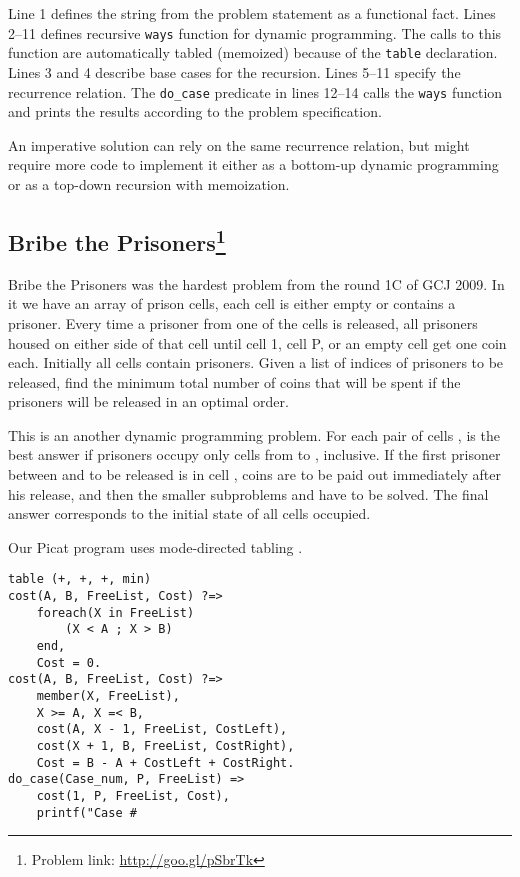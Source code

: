 \documentclass{llncs}
\begin{document}
Line 1 defines the string  from the problem statement as a functional fact.
Lines 2--11 defines recursive \texttt{ways} function for dynamic programming. The calls to this function are automatically tabled (memoized) because of the \texttt{table} declaration.
Lines 3 and 4 describe base cases for the recursion. Lines 5--11 specify the recurrence relation.
The \texttt{do\_case} predicate in lines 12--14 calls the \texttt{ways} function and prints the results according to the problem specification.

An imperative solution can rely on the same recurrence relation, but might require more code to implement it either as a bottom-up dynamic programming or as a top-down recursion with memoization.


\subsection*{Bribe the Prisoners\footnote{Problem link: \url{http://goo.gl/pSbrTk}}}

Bribe the Prisoners was the hardest problem from the round 1C of GCJ 2009.
In it we have an array of  prison cells, each cell is either empty or contains a prisoner. Every time a prisoner from one of the cells is released, all prisoners housed on either side of that cell until cell 1, cell P, or an empty cell get one coin each. Initially all cells contain prisoners.
Given a list of indices of prisoners to be released, find the minimum total number of coins that will be spent if the prisoners will be released in an optimal order.

This is an another dynamic programming problem. For each pair of cells ,  is the best answer if prisoners occupy only cells from  to , inclusive.
If the first prisoner between  and  to be released is in cell ,  coins are to be paid out immediately after his release, and then the smaller subproblems  and  have to be solved. The final answer  corresponds to the initial state of all cells occupied.

Our Picat program uses mode-directed tabling \cite{zhou2010mode}.

\begin{lstlisting}[caption={Picat solution for the ``Bribe the Prisoners'' problem}]
table (+, +, +, min)
cost(A, B, FreeList, Cost) ?=>
    foreach(X in FreeList)
        (X < A ; X > B)
    end,
    Cost = 0.
cost(A, B, FreeList, Cost) ?=>
    member(X, FreeList),
    X >= A, X =< B,
    cost(A, X - 1, FreeList, CostLeft),
    cost(X + 1, B, FreeList, CostRight),
    Cost = B - A + CostLeft + CostRight.
do_case(Case_num, P, FreeList) =>
    cost(1, P, FreeList, Cost),
    printf("Case #\end{lstlisting}
\end{document}
